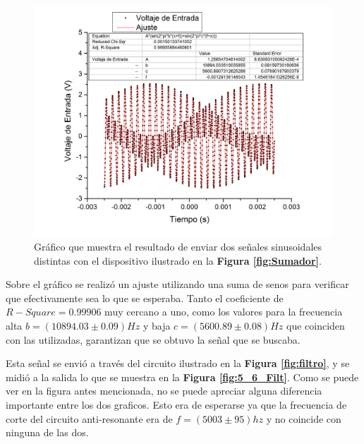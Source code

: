 \documentclass[11pt,a4paper]{article}
\begin{document}
\begin{figure}[H]
\centering
\includegraphics[scale=0.5]{5600hz.jpg}
\caption{Gráfico que muestra el resultado de enviar dos señales sinusoidales distintas con el dispositivo ilustrado en la \textbf{Figura \ref{fig:Sumador}}.}
\label{fig:5_6}
\end{figure}

Sobre el gráfico se realizó un ajuste utilizando una suma de senos para verificar que efectivamente sea lo que se esperaba. Tanto el coeficiente de $R-Square = 0.99906$ muy cercano a uno, como los valores para la frecuencia alta $b = (10894.03 \pm 0.09)Hz$ y baja $c = (5600.89 \pm 0.08)Hz$ que coinciden con las utilizadas, garantizan que se obtuvo la señal que se buscaba.

Esta señal se envió a través del circuito ilustrado en la \textbf{Figura \ref{fig:filtro}}, y se midió a la salida lo que se muestra en la \textbf{Figura \ref{fig:5_6_Filt}}. Como se puede ver en la figura antes mencionada, no se puede apreciar alguna diferencia importante entre los dos graficos. Esto era de esperarse ya que la frecuencia de corte del circuito anti-resonante era de $f= (5003 \pm 95)hz$ y no coincide con ninguna de las dos.
\end{document}
